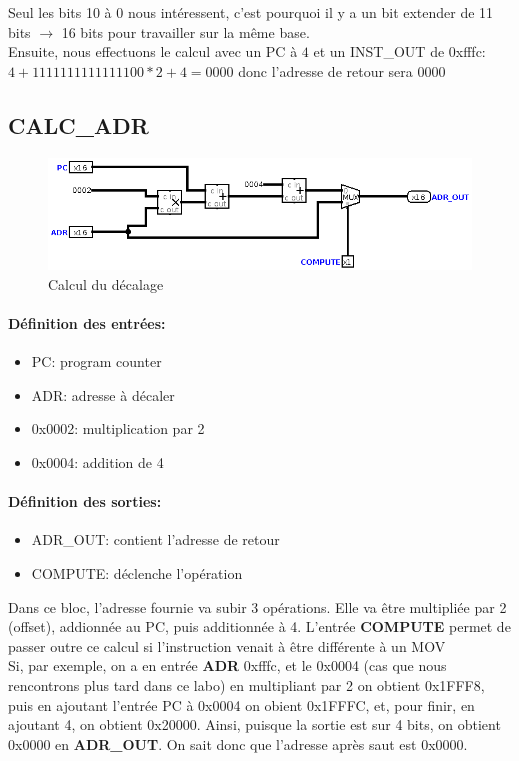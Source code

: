 \documentclass[a4paper]{article} %
\begin{document}
    \medskip
Seul les bits 10 à 0 nous intéressent, c'est pourquoi il y a un bit extender de 11 bits $\rightarrow$ 16 bits pour travailler sur la même base.\\
Ensuite, nous effectuons le calcul avec un PC à $4$ et un INST\_OUT de 0xfffc: $4 + 1111111111111100 * 2 + 4=0000$ donc l'adresse de retour sera $0000$

\subsection{CALC\_ADR} \label{bl_calc_adr}
\begin{figure}[H]
    \centering
    \includegraphics[width=.8\textwidth]{src/CALC_ADR.png}
    \caption{Calcul du décalage}
    \label{bl_calc_adr}
\end{figure}
\paragraph{Définition des entrées:}
\begin{itemize}
    \item     PC: program counter
    \item     ADR: adresse à décaler
    \item     0x0002: multiplication par 2
    \item     0x0004: addition de 4
\end{itemize}

\paragraph{Définition des sorties:}
\begin{itemize}
    \item ADR\_OUT: contient l'adresse de retour
    \item COMPUTE: déclenche l'opération
\end{itemize}
\medskip
Dans ce bloc, l'adresse fournie va subir 3 opérations. Elle va être multipliée par 2 (offset), addionnée au PC, puis additionnée à 4. L'entrée \textbf{COMPUTE} permet de passer outre ce calcul si l'instruction venait à être différente à un MOV
\\
Si, par exemple, on a en entrée \textbf{ADR} 0xfffc, et le  0x0004 (cas que nous rencontrons plus tard dans ce labo) en multipliant par 2 on obtient 0x1FFF8, puis en ajoutant l'entrée PC à 0x0004 on obient 0x1FFFC, et, pour finir, en ajoutant 4, on obtient 0x20000. Ainsi, puisque la sortie est sur 4 bits, on obtient 0x0000 en \textbf{ADR\_OUT}. On sait donc que l'adresse après saut est 0x0000.
\end{document}
